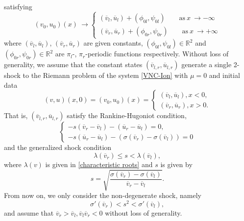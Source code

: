\documentclass[12pt,reqno]{amsart}
\numberwithin{equation}{section}
\def\R{\mathbb{R}}
\def\avl{\overline{v}_l}
\def\avr{\overline{v}_r}
\def\aul{\overline{u}_l}
\def\aur{\overline{u}_r}
\begin{document}
satisfying
\begin{equation}\label{cond-farfield}
	(v_0,u_0)(x)~\to 
	\begin{cases}
		(\overline{v}_l,\overline{u}_l)+(\phi_{0l},\psi_{0l}) \qquad \text{as}~x~\rightarrow -\infty\\
		(\overline{v}_r,\overline{u}_r)+(\phi_{0r},\psi_{0r}) \qquad \text{as}~x~\rightarrow +\infty
	\end{cases}
\end{equation}	
where $(\overline{v}_l,\overline{u}_l)$, $(\overline{v}_r,\overline{u}_r)$ are given constants, $(\phi_{0l},\psi_{0l}) \in \R^2$ and $(\phi_{0r},\psi_{0r}) \in \R^2$ are  $\pi_l$-, $\pi_r$-periodic functions respectively. 
Without loss of generality, we assume that the constant states $(\overline{v}_{l,r},\overline{u}_{l,r})$ generate a single 2-shock to the Riemann problem of the system \eqref{VNC-Ion} with $\mu=0$
and initial data
\begin{equation}\label{eini}
	(v,u)(x,0)=(v_0,u_0)(x)=
	\begin{cases}
		(\avl,\aul),x<0,\\
		(\avr,\aur),x>0.
	\end{cases}
\end{equation}
That is,  $(\overline{v}_{l,r},\overline{u}_{l,r})$ satisfy the Rankine-Hugoniot condition,
\begin{equation}\label{RH-cond}
	\begin{cases}
		-s(\overline{v}_r-\overline{v}_l)-(\overline{u}_r-\overline{u}_l)=0,\\
		-s(\overline{u}_r-\overline{u}_l)-(\sigma(\overline{v}_r)-\sigma(\overline{v}_l))=0
	\end{cases}
\end{equation}
and the generalized shock condition
\begin{equation}\label{degenerate}
 \lambda(\overline{v}_r)\leq s<\lambda(\overline{v}_l),
\end{equation}
where $\lambda(v)$ is given in \eqref{characteristic roots} and $s$ is given by
\begin{equation}\label{shock speed}
	s=\sqrt{\frac{\sigma(\overline{v}_r)-\sigma(\overline{v}_l)}{\overline{v}_r-\overline{v}_l}}.
\end{equation}
From now on,  we only consider the non-degenerate shock, namely 
\begin{equation}\label{non-degenerate}
	\sigma'(\overline{v}_r)< s^2<\sigma'(\overline{v}_l),
\end{equation} 
and assume that $\overline{v}_r>\overline{v}_l, \avl\avr<0$ without loss of generality.
\end{document}
